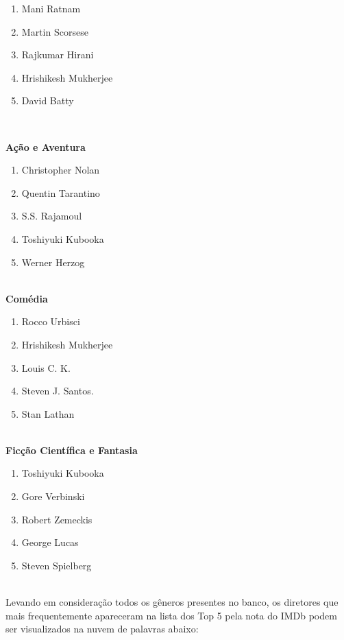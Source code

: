 \documentclass[a4paper, 12pt]{article} %
\begin{document}
\begin{enumerate}[topsep=0pt,partopsep=0pt]
    \item Mani Ratnam
    \item Martin Scorsese
    \item Rajkumar Hirani
    \item Hrishikesh Mukherjee
    \item David Batty
\end{enumerate}\\

\pagebreak

\textbf{Ação e Aventura}
\newline

\begin{enumerate}[topsep=0pt,partopsep=0pt]
    \item Christopher Nolan
    \item Quentin Tarantino
    \item S.S. Rajamoul
    \item Toshiyuki Kubooka
    \item Werner Herzog
\end{enumerate}\\

\textbf{Comédia}
\newline

\begin{enumerate}[topsep=0pt,partopsep=0pt]
    \item Rocco Urbisci
    \item Hrishikesh Mukherjee
    \item Louis C. K.
    \item Steven J. Santos.
    \item Stan Lathan
\end{enumerate}\\
\textbf{Ficção Científica e Fantasia}
\newline

\begin{enumerate}[topsep=0pt,partopsep=0pt]
    \item Toshiyuki Kubooka
    \item Gore Verbinski
    \item Robert Zemeckis
    \item George Lucas
    \item Steven Spielberg
\end{enumerate}\\

Levando em consideração todos os gêneros presentes no banco, os diretores que mais frequentemente apareceram na lista dos Top 5 pela nota do IMDb podem ser visualizados na nuvem de palavras abaixo:\\
\end{document}

